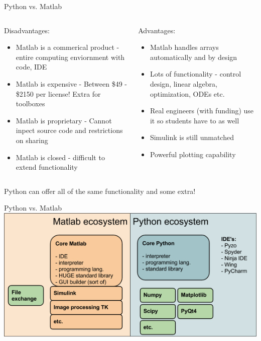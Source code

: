 \documentclass[11pt,professionalfonts]{beamer}
\begin{document}
\begin{frame}{Python vs. Matlab}
\begin{columns}[t]
\begin{column}{0.5\textwidth}
Disadvantages:
    \begin{itemize}
        \item Matlab is a commerical product - entire computing enviornment with code, IDE
        \item Matlab is expensive - Between \$49 - \$2150 per license! Extra for toolboxes
        \item Matlab is proprietary - Cannot inpect source code and restrictions on sharing 
        \item Matlab is closed - difficult to extend functionality 
    \end{itemize}
\end{column}
\pause
\begin{column}{0.5\textwidth}
    Advantages:
    \begin{itemize}
        \item Matlab handles arrays automatically and by design
        \item Lots of functionality - control design, linear algebra, optimization, ODEs etc.
        \item Real engineers (with funding) use it so students have to as well
        \item Simulink is still unmatched
        \item Powerful plotting capability
    \end{itemize}
\end{column}
\end{columns}
\pause
\begin{alertblock}{}
    \centering
    Python can offer all of the same functionality and some extra!
\end{alertblock}
\end{frame}

\begin{frame}{Python vs. Matlab}
    \includegraphics[width=\textwidth, height=\textheight, keepaspectratio]{figures/pythonvsmatlab.png}
\end{frame}
\end{document}
